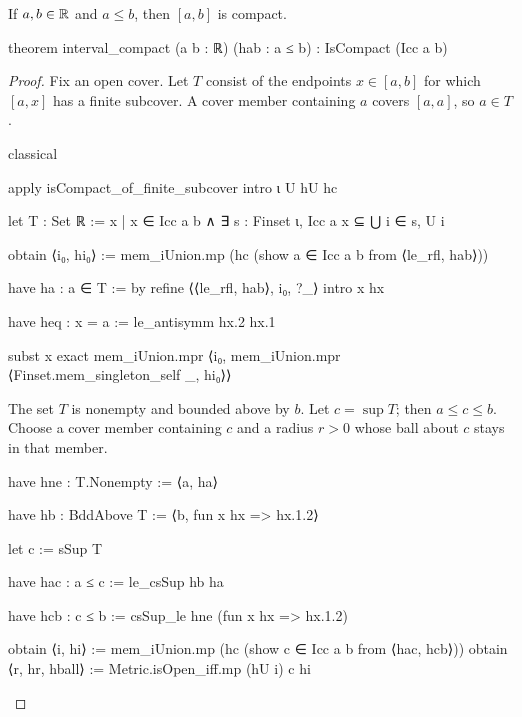 \begin{lemma}
  \label{an1:lem:interval-compact}
  If $a,b\in\mathbb{R}$ and $a\leq b$, then $[a,b]$ is compact.

  \begin{lean}
    theorem interval_compact (a b : ℝ) (hab : a ≤ b) : IsCompact (Icc a b)
  \end{lean}
\end{lemma}

\begin{proof}
  Fix an open cover.
  Let $T$ consist of the endpoints $x\in[a,b]$ for which $[a,x]$ has a finite subcover.
  A cover member containing $a$ covers $[a,a]$, so $a\in T$.

  \begin{lean}
    classical

    apply isCompact_of_finite_subcover
    intro ι U hU hc

    let T : Set ℝ := {x | x ∈ Icc a b ∧ ∃ s : Finset ι, Icc a x ⊆ ⋃ i ∈ s, U i}

    obtain ⟨i₀, hi₀⟩ := mem_iUnion.mp (hc (show a ∈ Icc a b from ⟨le_rfl, hab⟩))

    have ha : a ∈ T := by
      refine ⟨⟨le_rfl, hab⟩, {i₀}, ?_⟩
      intro x hx

      have heq : x = a := le_antisymm hx.2 hx.1

      subst x
      exact mem_iUnion.mpr ⟨i₀, mem_iUnion.mpr ⟨Finset.mem_singleton_self _, hi₀⟩⟩
  \end{lean}

  The set $T$ is nonempty and bounded above by $b$.
  Let $c=\sup T$; then $a\leq c\leq b$.
  Choose a cover member containing $c$ and a radius $r>0$ whose ball about $c$ stays in that
  member.

  \begin{lean}
    have hne : T.Nonempty := ⟨a, ha⟩

    have hb : BddAbove T := ⟨b, fun x hx => hx.1.2⟩

    let c := sSup T

    have hac : a ≤ c := le_csSup hb ha

    have hcb : c ≤ b := csSup_le hne (fun x hx => hx.1.2)

    obtain ⟨i, hi⟩ := mem_iUnion.mp (hc (show c ∈ Icc a b from ⟨hac, hcb⟩))
    obtain ⟨r, hr, hball⟩ := Metric.isOpen_iff.mp (hU i) c hi
  \end{lean}


\end{proof}
